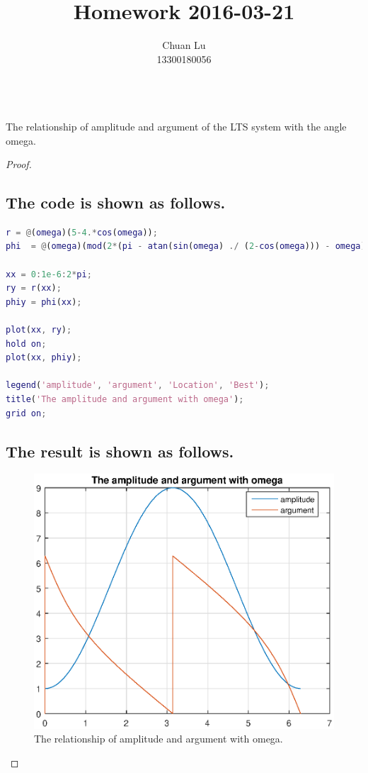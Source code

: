 \documentclass{article}
\newenvironment{problem}[2][Problem]{\begin{trivlist}
\item[\hskip \labelsep {\bfseries #1}\hskip \labelsep {\bfseries #2.}]}{\end{trivlist}}
\begin{document}
\title{Homework 2016-03-21}
\author{Chuan Lu\\
13300180056}

\maketitle

\begin{problem}{1}
\text{ }\\
The relationship of amplitude and argument of the LTS system with the angle omega.
\end{problem}
\begin{proof}
\subsection{The code is shown as follows.}
\begin{lstlisting}[language = {MATLAB}]
r = @(omega)(5-4.*cos(omega));
phi  = @(omega)(mod(2*(pi - atan(sin(omega) ./ (2-cos(omega))) - omega), 2*pi));

xx = 0:1e-6:2*pi;
ry = r(xx);
phiy = phi(xx);

plot(xx, ry);
hold on;
plot(xx, phiy);

legend('amplitude', 'argument', 'Location', 'Best');
title('The amplitude and argument with omega');
grid on;
\end{lstlisting}
\subsection{The result is shown as follows.}
\begin{figure}[htbp]
\centering
\includegraphics[width = 15cm]{relationship.eps}
\caption{The relationship of amplitude and argument with omega.}
\label{Relationship}
\end{figure}
\end{proof}
\end{document}
